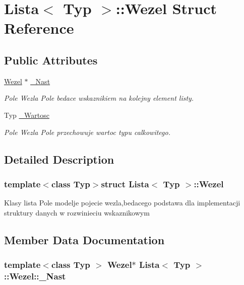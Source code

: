 \hypertarget{struct_lista_1_1_wezel}{\section{Lista$<$ Typ $>$\-:\-:Wezel Struct Reference}
\label{struct_lista_1_1_wezel}
}
\subsection*{Public Attributes}
\begin{DoxyCompactItemize}
\item 
\hyperlink{struct_lista_1_1_wezel}{Wezel} $\ast$ \hyperlink{struct_lista_1_1_wezel_a6f71b34a0536853ccd08a63c69fba79b}{\-\_\-\-Nast}
\begin{DoxyCompactList}\small\item\em Pole Wezla Pole bedace wskaznikiem na kolejny element listy. \end{DoxyCompactList}\item 
Typ \hyperlink{struct_lista_1_1_wezel_a5873e379887a28a814be35810883e743}{\-\_\-\-Wartosc}
\begin{DoxyCompactList}\small\item\em Pole Wezla Pole przechowuje wartoc typu calkowitego. \end{DoxyCompactList}\end{DoxyCompactItemize}


\subsection{Detailed Description}
\subsubsection*{template$<$class Typ$>$struct Lista$<$ Typ $>$\-::\-Wezel}

Klasy lista Pole modelje pojecie wezla,bedacego podstawa dla implementacji struktury danych w rozwinieciu wskaznikowym 

\subsection{Member Data Documentation}
\hypertarget{struct_lista_1_1_wezel_a6f71b34a0536853ccd08a63c69fba79b}{
\subsubsection[{\-\_\-\-Nast}]{\setlength{\rightskip}{0pt plus 5cm}template$<$class Typ $>$ {\bf Wezel}$\ast$ {\bf Lista}$<$ Typ $>$\-::Wezel\-::\-\_\-\-Nast}}\label{struct_lista_1_1_wezel_a6f71b34a0536853ccd08a63c69fba79b}


